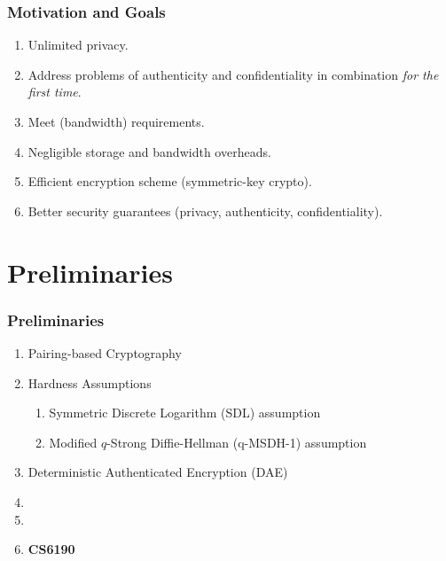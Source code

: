 \documentclass{beamer}
\begin{document}
    \begin{frame}
        \frametitle{Motivation and Goals}
        \begin{enumerate}
            \item<1-> Unlimited privacy.
            \item<1-> Address problems of authenticity and confidentiality in
            combination \emph{for the first time}.
            \item<2-> Meet (bandwidth) requirements.
            \item<2-> Negligible storage and bandwidth overheads.
            \item<3-> Efficient encryption scheme (symmetric-key crypto).
            \item<3-> Better security guarantees (privacy, authenticity,
            confidentiality).
        \end{enumerate}
    \end{frame}

    \section{Preliminaries}

    \begin{frame}
        \frametitle{Preliminaries}
        \begin{enumerate}
            \item Pairing-based Cryptography
            \item Hardness Assumptions
            \begin{enumerate}
                \item Symmetric Discrete Logarithm (SDL) assumption
                \item Modified \(q\)-Strong Diffie-Hellman (q-MSDH-1) assumption
            \end{enumerate}
            \item Deterministic Authenticated Encryption (DAE)
            \item {}
            \item {}
            \item<2-> \textbf{CS6190}
        \end{enumerate}
    \end{frame}
\end{document}
